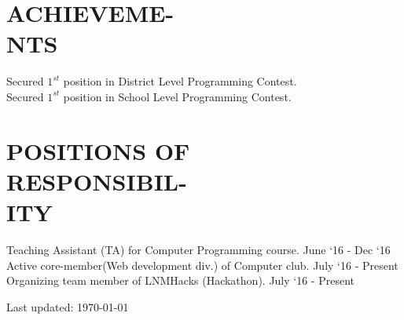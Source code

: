 \documentclass[margin]{res}
\begin{document}
\begin{resume}
\section{ACHIEVEME-\\NTS}
    Secured $1^{st}$ position in District Level Programming Contest.\\
    Secured $1^{st}$ position in School Level Programming Contest.\\

\section{POSITIONS OF\\ RESPONSIBIL-\\ITY}
    Teaching Assistant (TA) for Computer Programming course. \hfill June `16 - Dec `16\\
    Active core-member(Web development div.) of Computer club. \hfill July `16 - Present\\
    Organizing team member of LNMHacks (Hackathon). \hfill July `16 - Present\\


\begin{center}
  \begin{footnotesize}
    Last updated: \today \\
  \end{footnotesize}
\end{center}

\end{resume}
\end{document}
